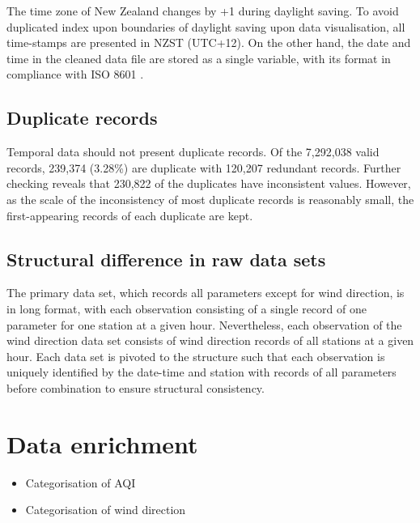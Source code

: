 \documentclass{aucklandthesis}
\begin{document}
The time zone of New Zealand changes by +1 during daylight saving. To avoid duplicated index upon boundaries of daylight saving upon data visualisation, all time-stamps are presented in NZST (UTC+12). On the other hand, the date and time in the cleaned data file are stored as a single variable, with its format in compliance with ISO 8601 \autocite{iso8601,readr}.

\hypertarget{duplicate-records}{%
\subsection{Duplicate records}\label{duplicate-records}}

Temporal data should not present duplicate records. Of the 7,292,038 valid records, 239,374 (3.28\%) are duplicate with 120,207 redundant records. Further checking reveals that 230,822 of the duplicates have inconsistent values. However, as the scale of the inconsistency of most duplicate records is reasonably small, the first-appearing records of each duplicate are kept.

\hypertarget{structural-difference-in-raw-data-sets}{%
\subsection{Structural difference in raw data sets}\label{structural-difference-in-raw-data-sets}}

The primary data set, which records all parameters except for wind direction, is in long format, with each observation consisting of a single record of one parameter for one station at a given hour. Nevertheless, each observation of the wind direction data set consists of wind direction records of all stations at a given hour. Each data set is pivoted to the structure such that each observation is uniquely identified by the date-time and station with records of all parameters before combination to ensure structural consistency.

\hypertarget{data-enrichment}{%
\section{Data enrichment}\label{data-enrichment}}

\begin{itemize}
\tightlist
\item
  Categorisation of AQI
\item
  Categorisation of wind direction
\end{itemize}
\end{document}
